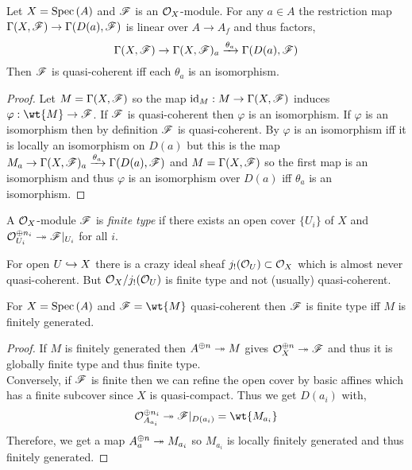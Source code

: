 \documentclass[12pt]{article}
\begin{document}
\begin{prop}
Let $X = \mathrm{Spec}\left( A \right)$ and $\mathscr{F}$ is an $\mathcal{O}_{X}$-module. For any $a \in A$ the restriction map $\Gamma(X, \mathscr{F}) \to \Gamma(D(a), \mathscr{F})$ is linear over $A \to A_f$ and thus factors,
\[ \Gamma(X, \mathscr{F}) \to \Gamma(X, \mathscr{F})_a \xrightarrow{\theta_a} \Gamma(D(a), \mathscr{F}) \]
Then $\mathscr{F}$ is quasi-coherent iff each $\theta_a$ is an isomorphism.
\end{prop}

\begin{proof}
Let $M = \Gamma(X, \mathscr{F})$ so the map $\mathrm{id}_M : M \to \Gamma(X, \mathscr{F})$ induces $\varphi : \wt{M} \to \F$. If $\mathscr{F}$ is quasi-coherent then $\varphi$ is an isomorphism. If $\varphi$ is an isomorphism then by definition $\mathscr{F}$ is quasi-coherent. By $\varphi$ is an isomorphism iff it is locally an isomorphism on $D(a)$ but this is the map $M_a \to \Gamma(X, \mathscr{F})_a \xrightarrow{\theta_a} \Gamma(D(a), \mathscr{F})$ and $M = \Gamma(X, \mathscr{F})$ so the first map is an isomorphism and thus $\varphi$ is an isomorphism over $D(a)$ iff $\theta_a$ is an isomorphism.
\end{proof}

\begin{defn}
A $\mathcal{O}_{X}$-module $\mathscr{F}$ is \textit{finite type} if there exists an open cover $\{ U_i \}$ of $X$ and $\mathcal{O}_{U_i}^{\oplus n_i} \twoheadrightarrow \mathscr{F}|_{U_i}$ for all $i$.
\end{defn}

\begin{rmk}
For open $U \hookrightarrow X$ there is a crazy ideal sheaf $j_!(\mathcal{O}_{U}) \subset \mathcal{O}_{X}$ which is almost never quasi-coherent. But $\mathcal{O}_{X} / j_!( \mathcal{O}_{U} )$ is finite type and not (usually) quasi-coherent. 
\end{rmk}

\begin{prop}
For $X = \mathrm{Spec}\left( A \right)$ and $\F = \wt{M}$ quasi-coherent then $\mathscr{F}$ is finite type iff $M$ is finitely generated.
\end{prop}

\begin{proof}
If $M$ is finitely generated then $A^{\oplus n} \twoheadrightarrow M$ gives $\mathcal{O}_{X}^{\oplus n} \twoheadrightarrow \mathscr{F}$ and thus it is globally finite type and thus finite type.
\bigskip\\
Conversely, if $\mathscr{F}$ is finite then we can refine the open cover by basic affines which has a finite subcover since $X$ is quasi-compact. Thus we get $D(a_i)$ with,
\[ \struct{A_{a_i}}^{\oplus {n_i}} \onto \F|_{D(a_i)} = \wt{M_{a_i}} \]
Therefore, we get a map $A_a^{\oplus n} \twoheadrightarrow M_{a_i}$ so $M_{a_i}$ is locally finitely generated and thus finitely generated. 
\end{proof}
\end{document}
